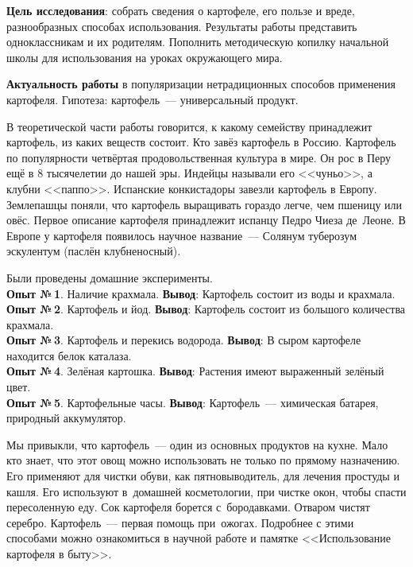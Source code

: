


\makeProcTitleSchool


\textbf{Цель исследования}: собрать сведения о картофеле, его пользе и вреде, разнообразных способах использования. Результаты работы представить одноклассникам и их родителям. Пополнить методическую копилку начальной школы для использования на уроках окружающего мира.

\textbf{Актуальность работы} в популяризации нетрадиционных способов применения картофеля. Гипотеза: картофель~--- универсальный продукт.

В теоретической части работы говорится, к какому семейству принадлежит картофель, из каких веществ состоит.	Кто завёз картофель в Россию. Картофель по популярности четвёртая продовольственная культура в мире. Он рос в Перу ещё в 8 тысячелетии до нашей эры. Индейцы называли его <<чуньо>>, а клубни <<паппо>>. Испанские конкистадоры завезли картофель в Европу.  Землепашцы поняли, что картофель выращивать гораздо легче, чем пшеницу или овёс. Первое описание картофеля принадлежит испанцу Педро Чиеза де~Леоне.  В Европе у картофеля появилось научное название~--- Солянум туберозум эскулентум (паслён клубненосный).

Были проведены домашние эксперименты.\\
\textbf{Опыт №\,1}. Наличие крахмала. \textbf{Вывод}: Картофель состоит из воды и крахмала.\\
\textbf{Опыт №\,2}. Картофель и йод. \textbf{Вывод}: Картофель состоит из большого количества крахмала.\\
\textbf{Опыт №\,3}. Картофель и перекись водорода. \textbf{Вывод}: В сыром картофеле находится белок каталаза.\enlargethispage{2\baselineskip}\\
\textbf{Опыт №\,4}. Зелёная картошка. \textbf{Вывод}: Растения имеют выраженный зелёный цвет.\\
\textbf{Опыт №\,5}. Картофельные часы.	\textbf{Вывод}: Картофель~--- химическая батарея, природный  аккумулятор.

Мы привыкли, что картофель~--- один из основных продуктов на кухне. Мало кто знает, что этот овощ можно использовать не только по прямому назначению. Его применяют для чистки обуви, как пятновыводитель, для лечения простуды и кашля. Его используют в~домашней косметологии, при чистке окон, чтобы спасти пересоленную еду. Сок картофеля борется с~бородавками. Отваром чистят серебро. Картофель~--- первая помощь при~ожогах. Подробнее с этими способами можно ознакомиться в научной работе и памятке <<Использование картофеля в быту>>.

